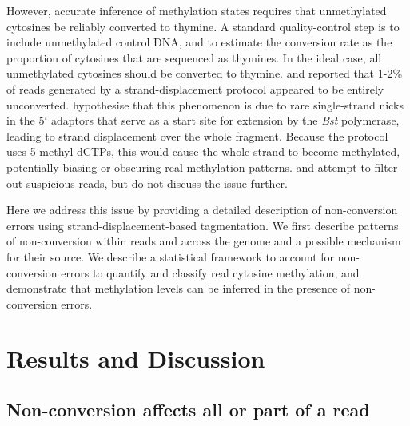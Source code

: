 \documentclass[twocolumn,twoside,lettersize]{article}
\begin{document}
However, accurate inference of methylation states requires that unmethylated cytosines be reliably converted to thymine.
A standard quality-control step is to include unmethylated control DNA, and to estimate the conversion rate as the proportion of cytosines that are sequenced as thymines.
In the ideal case, all unmethylated cytosines should be converted to thymine.
\textcite{lu2015improved} and \textcite{suzuki2018whole} reported that 1-2\% of reads generated by a strand-displacement protocol appeared to be entirely unconverted.
\textcite{lu2015improved} hypothesise that this phenomenon is due to rare single-strand nicks in the 5` adaptors that serve as a start site for extension by the \textit{Bst} polymerase, leading to strand displacement over the whole fragment.
Because the protocol uses 5-methyl-dCTPs, this would cause the whole strand to become methylated, potentially biasing or obscuring real methylation patterns.
\textcite{lu2015improved} and \textcite{suzuki2018whole} attempt to filter out suspicious reads, but do not discuss the issue further.

Here we address this issue by providing a detailed description of non-conversion errors using strand-displacement-based tagmentation.
We first describe patterns of non-conversion within reads and across the genome and a possible mechanism for their source.
We describe a statistical framework to account for non-conversion errors to quantify and classify real cytosine methylation, and demonstrate that methylation levels can be inferred in the presence of non-conversion errors.

\section{Results and Discussion}

\subsection{Non-conversion affects all or part of a read}
\end{document}
